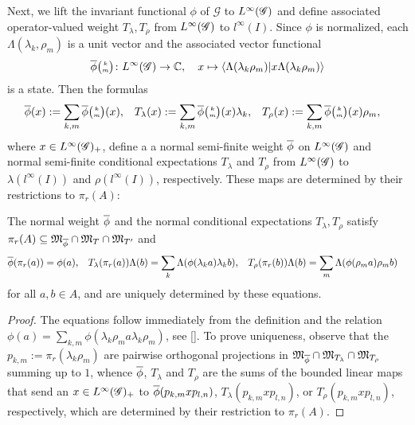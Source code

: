 Next, we lift the invariant functional $\phi$ of $\mathscr{G}$ to
$L^{\infty}(\mathscr{G})$ and define associated operator-valued weight
$T_{\lambda},T_{\rho}$ from $L^{\infty}(\mathscr{G})$ to $l^{\infty}(I)$. Since $\phi$ is normalized, each
$\Lambda(\lambda_{k},\rho_{m})$ is a unit vector and the associated
vector functional
\begin{align*}
  \overline{\phi}{\tiny {\begin{pmatrix} k\\m\end{pmatrix}}}\colon L^{\infty}(\mathscr{G}) \to  \mathbb{C}, \quad x \mapsto \langle\Lambda(\lambda_{k}\rho_{m})|x\Lambda(\lambda_{k}\rho_{m})\rangle
\end{align*}
is a state.  Then the formulas
\begin{align} \label{eq:vn-weights}
  \overline{\phi}(x) &:= \sum_{k,m} \overline{\phi}{\tiny {\begin{pmatrix} k\\m\end{pmatrix}}}(x), &
    T_{\lambda}(x)&:= \sum_{k,m}
\overline{\phi}{\tiny {\begin{pmatrix} k\\m\end{pmatrix}}}(x)\lambda_{k}, & 
T_{\rho}(x)&:=
    \sum_{k,m} \overline{\phi}{\tiny {\begin{pmatrix} k\\m\end{pmatrix}}}(x)\rho_{m},
\end{align}
where $x\in L^{\infty}(\mathscr{G})_{+}$, define a a normal semi-finite weight $\overline{\phi}$
on $L^{\infty}(\mathscr{G})$ and normal semi-finite conditional expectations $T_{\lambda}$ and
$T_{\rho}$ from $L^{\infty}(\mathscr{G})$ to $\lambda(l^{\infty}(I))$ and
$\rho(l^{\infty}(I))$, respectively. These maps are determined by
their restrictions to $\pi_{r}(A)$:
\begin{Lem} \label{lemma:vn-weights-unique} The normal weight $\overline{\phi}$ and
  the normal conditional expectations $T_{\lambda},T_{\rho}$ satisfy $\pi_{r}(A) \subseteq
  \mathfrak{M}_{\overline{\phi}} \cap \mathfrak{M}_{T} \cap \mathfrak{M}_{T'}$
  and
  \begin{align*}
    \overline{\phi}(\pi_{r}(a))&= \phi(a), & T_{\lambda}(\pi_{r}(a))\Lambda(b) &=
    \sum_{k}\Lambda(\phi(\lambda_{k}a)\lambda_{k}b), &
    T_{\rho}(\pi_{r}(b))\Lambda(b) &= \sum_{m}\Lambda(\phi(\rho_{m}a)\rho_{m}b)
  \end{align*}
  for all $a,b\in A$, and are uniquely determined by these equations. 
\end{Lem}
\begin{proof}
  The equations follow immediately from the definition and the
  relation $\phi(a)=\sum_{k,m}
  \phi(\lambda_{k}\rho_{m}a\lambda_{k}\rho_{m})$, see \ref{}. To prove
  uniqueness, observe that the $p_{k,m}:=\pi_{r}(\lambda_{k}\rho_{m})$ are
  pairwise orthogonal projections in $\mathfrak{M}_{\overline{\phi}}
  \cap \mathfrak{M}_{T_{\lambda}} \cap \mathfrak{M}_{T_{\rho}}$
  summing up to $1$, whence $\overline{\phi}$, $T_{\lambda}$ and $T_{\rho}$ are
  the sums of the bounded linear maps that send an $x\in L^{\infty}(\mathscr{G})_{+}$
  to $\overline{\phi}(p_{k,m}xp_{l,n})$, $T_{\lambda}(p_{k,m}xp_{l,n})$, or
  $T_{\rho}(p_{k,m}xp_{l,n})$, respectively, which are determined by
  their restriction to $\pi_{r}(A)$.
\end{proof}


